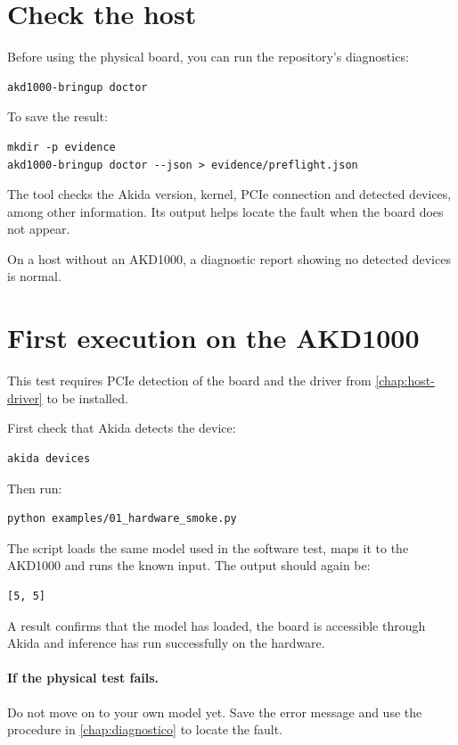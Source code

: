 \section{Check the host}

Before using the physical board, you can run the repository's diagnostics:

\begin{lstlisting}
akd1000-bringup doctor
\end{lstlisting}

To save the result:

\begin{lstlisting}
mkdir -p evidence
akd1000-bringup doctor --json > evidence/preflight.json
\end{lstlisting}

The tool checks the Akida version, kernel, PCIe connection and detected devices,
among other information. Its output helps locate the fault when the board does not appear.

On a host without an AKD1000, a diagnostic report showing no detected devices is normal.

\section{First execution on the AKD1000}

This test requires PCIe detection of the board and the driver from
\cref{chap:host-driver} to be installed.

First check that Akida detects the device:

\begin{lstlisting}
akida devices
\end{lstlisting}

Then run:

\begin{lstlisting}
python examples/01_hardware_smoke.py
\end{lstlisting}

The script loads the same model used in the software test, maps it to the AKD1000
and runs the known input. The output should again be:

\begin{lstlisting}
[5, 5]
\end{lstlisting}

A  result confirms that the model has loaded, the board is accessible
through Akida and inference has run successfully on the hardware.

\paragraph{If the physical test fails.}
Do not move on to your own model yet. Save the error message and use the procedure
in \cref{chap:diagnostico} to locate the fault.

